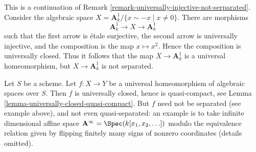 \begin{example}
\label{example-universal-homeomorphism}
This is a continuation of
Remark \ref{remark-universally-injective-not-serparated}.
Consider the algebraic space
$X = \mathbf{A}^1_k/\{x \sim -x \mid x \not = 0\}$.
There are morphisms
$$
\mathbf{A}^1_k \longrightarrow X \longrightarrow \mathbf{A}^1_k
$$
such that the first arrow is \'etale surjective, the second arrow is
universally injective, and the composition is the map $x \mapsto x^2$.
Hence the composition is universally closed. Thus it follows that the
map $X \to \mathbf{A}^1_k$ is a universal homeomorphism, but
$X \to \mathbf{A}^1_k$ is not separated.
\end{example}

\noindent
Let $S$ be a scheme.
Let $f : X \to Y$ be a universal homeomorphism of algebraic spaces
over $S$. Then $f$ is universally closed, hence is quasi-compact, see
Lemma \ref{lemma-universally-closed-quasi-compact}.
But $f$ need not be separated (see example above), and not even
quasi-separated: an example is to take infinite dimensional affine
space $\mathbf{A}^\infty = \Spec(k[x_1, x_2, \ldots])$ modulo
the equivalence relation given by flipping finitely many signs of
nonzero coordinates (details omitted).
































